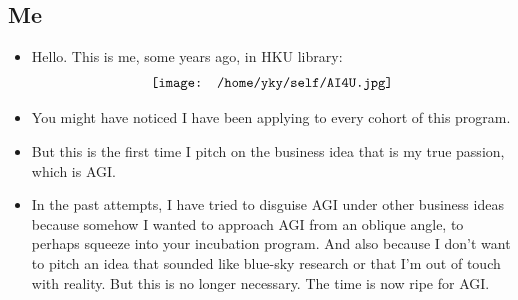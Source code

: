 \newcommand{\circled}[1]{{\textcircled{\sffamily \scriptsize{#1}}}}



\begin{preview}

\cc{
\title{\vspace{-1.5cm} \bfseries\color{blue}{\LARGE 全球化 AGI 项目}}
}{
\title{\vspace{-1.5cm} \bfseries\color{blue}{\LARGE Global AGI Project}}
}

\date{\vspace{-2cm}} %

\maketitle

\setcounter{section}{-1}
\setcounter{mypage}{1}


\begin{minipage}{\textwidth}
\setlength{\parskip}{0.4\baselineskip}

\section{Me}

\begin{itemize}

	\item Hello. This is me, some years ago, in HKU library: \\
	\begin{equation}
	\nonumber
	\vcenter{\hbox{\texttt{[image: /home/yky/self/AI4U.jpg]}}}
	\end{equation}

	\item You might have noticed I have been applying to every cohort of this program.
	
	\item But this is the first time I pitch on the business idea that is my true passion, which is AGI.
	
	\item In the past attempts, I have tried to disguise AGI under other business ideas because somehow I wanted to approach AGI from an oblique angle, to perhaps squeeze into your incubation program.  And also because I don't want to pitch an idea that sounded like blue-sky research or that I'm out of touch with reality.  But this is no longer necessary.  The time is now ripe for AGI.
	

\end{itemize}
\end{minipage}
\end{preview}
